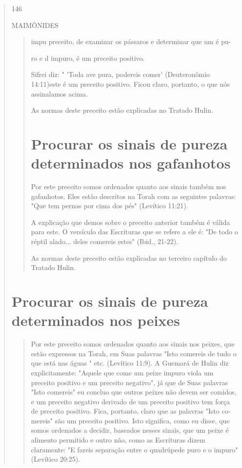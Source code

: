 \begin{quote}
146

MAIMÔNIDES

\begin{quote}
impu preceito, de examinar os pássaros e determinar que um é pu-

ro e d impuro, é um preceito positivo.

Sifrei diz: " 'Toda ave pura, podereis comer' (Deuteronômio 14:11)este é
um preceito positivo. Ficou claro, portanto, o que nós assinala­mos
acima.

As normas deste preceito estão explicadas no Tratado Hulin.

\section{Procurar os sinais de pureza determinados nos gafanhotos}

Por este preceito somos ordenados quanto aos sinais também nos
gafanhotos. Eles estão descritos na Torah com as seguintes palavras:
"Que tem pernas por cima dos pés" (Levítico 11:21).

A explicação que demos sobre o preceito anterior também é válida para
este. O versículo das Escrituras que se refere a ele é: "De todo o
réptil alado... deles comereis estes" (Ibid., 21-22).

As normas deste preceito estão explicadas no terceiro capítulo do
Tratado Hulin.
\end{quote}

\section{Procurar os sinais de pureza determinados nos peixes}

\begin{quote}
Por este preceito somos ordenados quanto aos sinais nos peixes, que
estão expressos na Torah, em Suas palavras "Isto comereis de tudo o que
está nas águas " etc. (Levítico 11:9). A Guemará de Hulin diz
explicitamente: "Aquele que come um peixe impuro viola um preceito
positivo e um preceito negati­vo", já que de Suas palavras "Isto
comereis" eu concluo que outros peixes não devem ser comidos, e um
preceito negativo derivado de um preceito positivo tem força de preceito
positivo. Fica, portanto, claro que as palavras "Isto co­mereis" são um
preceito positivo. Isto significa, como eu disse, que somos or­denados a
decidir, baseados nesses sinais, que um peixe é alimento permitido e
outro não, como as Escrituras dizem claramente: "E fareis separação
entre o quadrúpede puro e o impuro" (Levítico 20:25).


\end{quote}
\end{quote}
